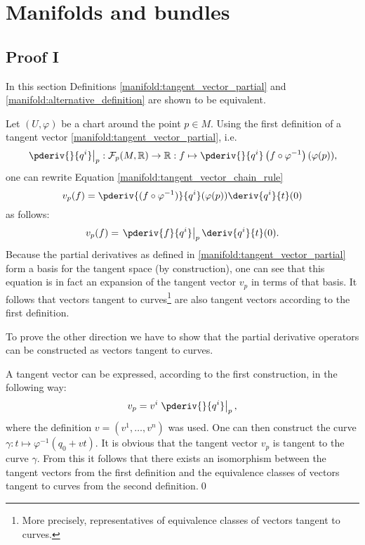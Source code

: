 \section{Manifolds and bundles}
\subsection{Proof I}

    In this section Definitions \ref{manifold:tangent_vector_partial} and \ref{manifold:alternative_definition} are shown to be equivalent.

    Let $(U,\varphi)$ be a chart around the point $p\in M$. Using the first definition of a tangent vector \ref{manifold:tangent_vector_partial}, i.e. \[\left.\pderiv{}{q^i}\right|_{p}:\mathcal{F}_p(M, \mathbb{R})\rightarrow\mathbb{R}:f\mapsto \pderiv{}{q^i}\left(f\circ\varphi^{-1}\right)(\varphi(p)),\] one can rewrite Equation \eqref{manifold:tangent_vector_chain_rule} \[v_p(f) = \pderiv{(f\circ\varphi^{-1})}{q^i}(\varphi(p))\deriv{q^i}{t}(0)\] as follows: \[v_p(f) = \left.\pderiv{f}{q^i}\right|_p\deriv{q^i}{t}(0).\] Because the partial derivatives as defined in \ref{manifold:tangent_vector_partial} form a basis for the tangent space (by construction), one can see that this equation is in fact an expansion of the tangent vector $v_p$ in terms of that basis. It follows that vectors tangent to curves\footnote{More precisely, representatives of equivalence classes of vectors tangent to curves.} are also tangent vectors according to the first definition.

    To prove the other direction we have to show that the partial derivative operators can be constructed as vectors tangent to curves.

    A tangent vector can be expressed, according to the first construction, in the following way: \[v_p = v^i\left.\pderiv{}{q^i}\right|_p,\] where the definition $v = (v^1,\ldots,v^n)$ was used. One can then construct the curve $\gamma:t\mapsto\varphi^{-1}(q_0+vt)$. It is obvious that the tangent vector $v_p$ is tangent to the curve $\gamma$. From this it follows that there exists an isomorphism between the tangent vectors from the first definition and the equivalence classes of vectors tangent to curves from the second definition.\qed

